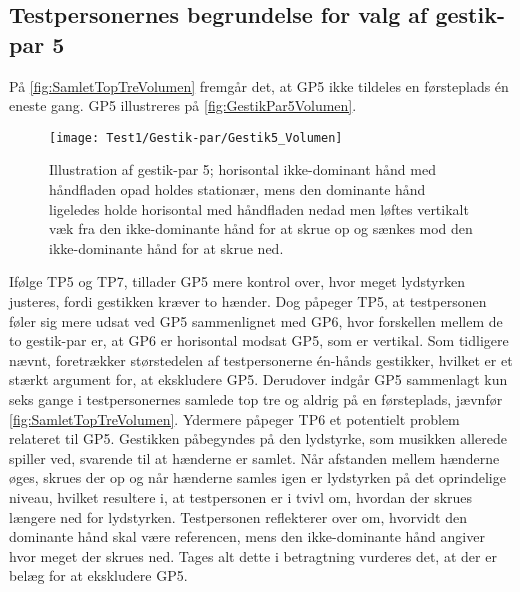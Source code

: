 \subsection{Testpersonernes begrundelse for valg af gestik-par 5}
\label{TestresultaterValgAfGestikkerBegrundelseGP5Volumen}
% 
På \autoref{fig:SamletTopTreVolumen} fremgår det, at GP5 ikke tildeles en førsteplads én eneste gang. GP5 illustreres på \autoref{fig:GestikPar5Volumen}.  
%
\begin{figure}[H]
	\centering
	\texttt{[image: Test1/Gestik-par/Gestik5\_Volumen]}
	\caption{Illustration af gestik-par 5; horisontal ikke-dominant hånd med håndfladen opad holdes stationær, mens den dominante hånd ligeledes holde horisontal med håndfladen nedad men løftes vertikalt væk fra den ikke-dominante hånd for at skrue op og sænkes mod den ikke-dominante hånd for at skrue ned.}
	\label{fig:GestikPar5Volumen}
\end{figure}
\noindent
%
Ifølge TP5 og TP7, tillader GP5 mere kontrol over, hvor meget lydstyrken justeres, fordi gestikken kræver to hænder. Dog påpeger TP5, at testpersonen føler sig mere udsat ved GP5 sammenlignet med GP6, hvor forskellen mellem de to gestik-par er, at GP6 er horisontal modsat GP5, som er vertikal.\blankline
%
Som tidligere nævnt, foretrækker størstedelen af testpersonerne én-hånds gestikker, hvilket er et stærkt argument for, at ekskludere GP5. Derudover indgår GP5 sammenlagt kun seks gange i testpersonernes samlede top tre og aldrig på en førsteplads, jævnfør \autoref{fig:SamletTopTreVolumen}. Ydermere påpeger TP6 et potentielt problem relateret til GP5. Gestikken påbegyndes på den lydstyrke, som musikken allerede spiller ved, svarende til at hænderne er samlet. Når afstanden mellem hænderne øges, skrues der op og når hænderne samles igen er lydstyrken på det oprindelige niveau, hvilket resultere i, at testpersonen er i tvivl om, hvordan der skrues længere ned for lydstyrken. Testpersonen reflekterer over om, hvorvidt den dominante hånd skal være referencen, mens den ikke-dominante hånd angiver hvor meget der skrues ned. Tages alt dette i betragtning vurderes det, at der er belæg for at ekskludere GP5.
%
